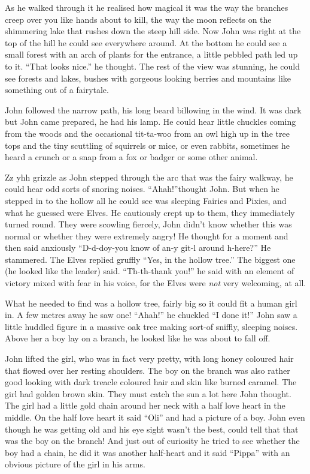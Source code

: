 As he walked through it he realised how magical it was the way the
branches creep over you like hands about to kill, the way the moon
reflects on the shimmering lake that rushes down the steep hill side.
Now John was right at the top of the hill he could see everywhere
around. At the bottom he could see a small forest with an arch of plants
for the entrance, a little pebbled path led up to it. ``That looks
nice.'' he thought. The rest of the view was stunning, he could see
forests and lakes, bushes with gorgeous looking berries and mountains
like something out of a fairytale.

John followed the narrow path, his long beard billowing in the wind. It
was dark but John came prepared, he had his lamp. He could hear little
chuckles coming from the woods and the occasional tit-ta-woo from an owl
high up in the tree tops and the tiny scuttling of squirrels or mice, or
even rabbits, sometimes he heard a crunch or a snap from a fox or badger
or some other animal.

Zz yhh grizzle as John stepped through the arc that was the fairy
walkway, he could hear odd sorts of snoring noises. ``Ahah!''thought
John. But when he stepped in to the hollow all he could see was sleeping
Fairies and Pixies, and what he guessed were Elves. He cautiously crept
up to them, they immediately turned round. They were scowling fiercely,
John didn't know whether this was normal or whether they were extremely
angry! He thought for a moment and then said anxiously ``D-d-doy-you
know of an-y git-l around h-here?'' He stammered. The Elves replied
gruffly ``Yes, in the hollow tree.'' The biggest one (he looked like the
leader) said. ``Th-th-thank you!'' he said with an element of victory
mixed with fear in his voice, for the Elves were \emph{not} very
welcoming, at all.

What he needed to find was a hollow tree, fairly big so it could fit a
human girl in. A few metres away he saw one! ``Ahah!'' he chuckled ``I
done it!'' John saw a little huddled figure in a massive oak tree making
sort-of sniffly, sleeping noises. Above her a boy lay on a branch, he
looked like he was about to fall off.

John lifted the girl, who was in fact very pretty, with long honey
coloured hair that flowed over her resting shoulders. The boy on the
branch was also rather good looking with dark treacle coloured hair and
skin like burned caramel. The girl had golden brown skin. They must
catch the sun a lot here John thought. The girl had a little gold chain
around her neck with a half love heart in the middle. On the half love
heart it said ``Oli'' and had a picture of a boy. John even though he
was getting old and his eye sight wasn't the best, could tell that that
was the boy on the branch! And just out of curiosity he tried to see
whether the boy had a chain, he did it was another half-heart and it
said ``Pippa'' with an obvious picture of the girl in his arms.

